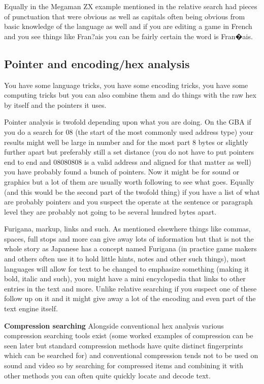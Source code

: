 \documentclass[
]{book}
\begin{document}
Equally in the Megaman ZX example mentioned in the relative search had pieces of punctuation that were obvious as well as capitals often being obvious from basic knowledge of the language as well and if you are editing a game in French and you see things like Fran?ais you can be fairly certain the word is Fran�ais.

\hypertarget{pointer-and-encodinghex-analysis}{%
\subsection{Pointer and encoding/hex analysis}\label{pointer-and-encodinghex-analysis}}

You have some language tricks, you have some encoding tricks, you have some computing tricks but you can also combine them and do things with the raw hex by itself and the pointers it uses.

Pointer analysis is twofold depending upon what you are doing. On the GBA if you do a search for 08 (the start of the most commonly used address type) your results might well be large in number and for the most part 8 bytes or slightly further apart but preferably still a set distance (you do not have to put pointers end to end and 08080808 is a valid address and aligned for that matter as well) you have probably found a bunch of pointers. Now it might be for sound or graphics but a lot of them are usually worth following to see what goes. Equally (and this would be the second part of the twofold thing) if you have a list of what are probably pointers and you suspect the operate at the sentence or paragraph level they are probably not going to be several hundred bytes apart.

Furigana, markup, links and such. As mentioned elsewhere things like commas, spaces, full stops and more can give away lots of information but that is not the whole story as Japanese has a concept named Furigana (in practice game makers and others often use it to hold little hints, notes and other such things), most languages will allow for text to be changed to emphasize something (making it bold, italic and such), you might have a mini encyclopedia that links to other entries in the text and more. Unlike relative searching if you suspect one of these follow up on it and it might give away a lot of the encoding and even part of the text engine itself.

\textbf{Compression searching} Alongside conventional hex analysis various compression searching tools exist (some worked examples of compression can be seen later but standard compression methods have quite distinct fingerprints which can be searched for) and conventional compression tends not to be used on sound and video so by searching for compressed items and combining it with other methods you can often quite quickly locate and decode text.
\end{document}
